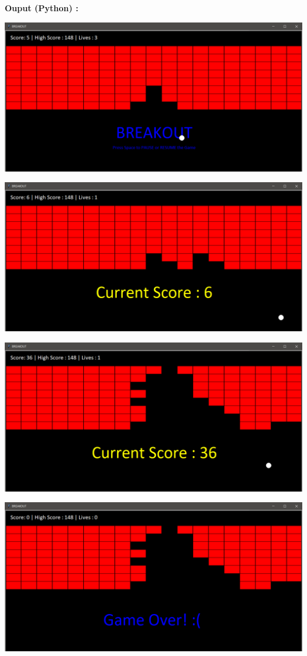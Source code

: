 \documentclass{article}
\begin{document}
\textbf{\bf Ouput (Python) : \\}
\begin{center}{\centering\includegraphics[scale=0.20]{py_out_01}}\end{center}
\begin{center}{\centering\includegraphics[scale=0.20]{py_out_02}}\end{center}
\begin{center}{\centering\includegraphics[scale=0.20]{py_out_03}}\end{center}
\begin{center}{\centering\includegraphics[scale=0.20]{py_out_04}}\end{center}
\end{document}
